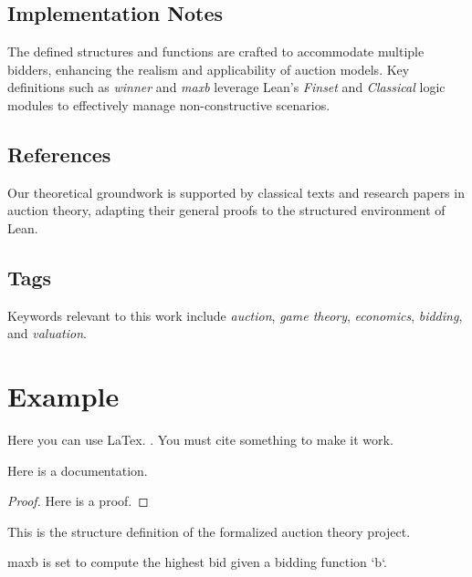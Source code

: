 \subsection{Implementation Notes}

The defined structures and functions are crafted to accommodate multiple bidders, enhancing the realism and applicability of auction models. Key definitions such as \textit{winner} and \textit{maxb} leverage Lean's \textit{Finset} and \textit{Classical} logic modules to effectively manage non-constructive scenarios.

\subsection{References}

Our theoretical groundwork is supported by classical texts and research papers in auction theory, adapting their general proofs to the structured environment of Lean.

\subsection{Tags}

Keywords relevant to this work include \textit{auction}, \textit{game theory}, \textit{economics}, \textit{bidding}, and \textit{valuation}.



\section{Example}
Here you can use LaTex. \cite{marcus}. You must cite something to make it work.

\begin{lemma}\label{two_different_elements}
    \leanok
    Here is a documentation.
\end{lemma}

\begin{proof}
    Here is a proof.
\end{proof}

\begin{definition}\label{Auction}
    \leanok
    This is the structure definition of the formalized auction theory project.
\end{definition}

\begin{definition}\label{maxb}
    \leanok
    maxb is set to compute the highest bid given a bidding function `b`.
\end{definition}

